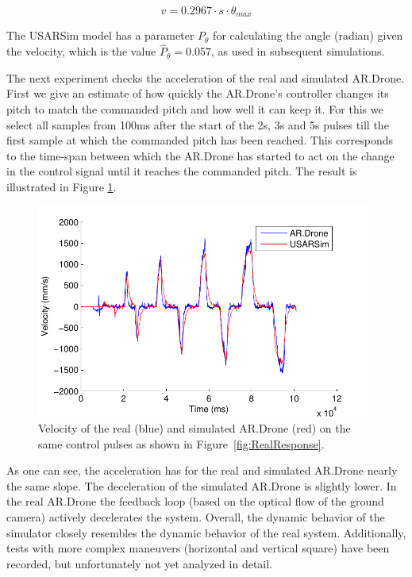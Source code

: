 \begin{equation}
v = 0.2967 \cdot s \cdot \theta_{max}
\label{eq:conversion}
\end{equation}

The USARSim model has a parameter $P_\theta$ for calculating the angle (radian) given the velocity, which
is the value $\hat{P}_\theta = 0.057$, as used in subsequent simulations.

The next experiment checks the acceleration of the real and simulated AR.Drone. First we give an estimate of how quickly the AR.Drone's controller changes its pitch to match the commanded pitch and how well it can keep it. For this we select all samples from 100ms after the start
of the 2s, 3s and 5s pulses till the first sample at which the commanded pitch has been reached. This
corresponds to the time-span between which the AR.Drone has started to act on the change in the control
signal until it reaches the commanded pitch. The result is illustrated in Figure \ref{fig:ComparisonOfResponse}.

\begin{figure}[htb]
\centering
\includegraphics[width=11cm]{images/RYtdB-eps-converted-to.pdf}
\caption{Velocity of the real (blue) and simulated AR.Drone (red) on the same control pulses as shown in Figure~\ref{fig:RealResponse}.}

\label{fig:ComparisonOfResponse}
\end{figure}

As one can see, the acceleration has for the real and simulated AR.Drone nearly the same slope. The deceleration of the simulated AR.Drone is slightly lower. In the real AR.Drone the feedback loop (based on the optical flow of the ground camera) actively decelerates the system. Overall, the dynamic behavior of the simulator closely resembles the dynamic behavior of the real system. Additionally, tests with more complex maneuvers (horizontal and vertical square) have been recorded, but unfortunately not yet analyzed in detail.


